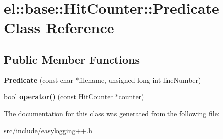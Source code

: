 \hypertarget{classel_1_1base_1_1_hit_counter_1_1_predicate}{}\section{el\+:\+:base\+:\+:Hit\+Counter\+:\+:Predicate Class Reference}
\label{classel_1_1base_1_1_hit_counter_1_1_predicate}
\subsection*{Public Member Functions}
\begin{DoxyCompactItemize}
\item 
\mbox{\label{classel_1_1base_1_1_hit_counter_1_1_predicate_ab35f4f7da40df5a788c3984d097bb38c}} 
{\bfseries Predicate} (const char $\ast$filename, unsigned long int line\+Number)
\item 
\mbox{\label{classel_1_1base_1_1_hit_counter_1_1_predicate_ae07b1562a3c0ed38457401e60b80b0c5}} 
bool {\bfseries operator()} (const \hyperlink{classel_1_1base_1_1_hit_counter}{Hit\+Counter} $\ast$counter)
\end{DoxyCompactItemize}


The documentation for this class was generated from the following file\+:\begin{DoxyCompactItemize}
\item 
src/include/easylogging++.\+h\end{DoxyCompactItemize}
